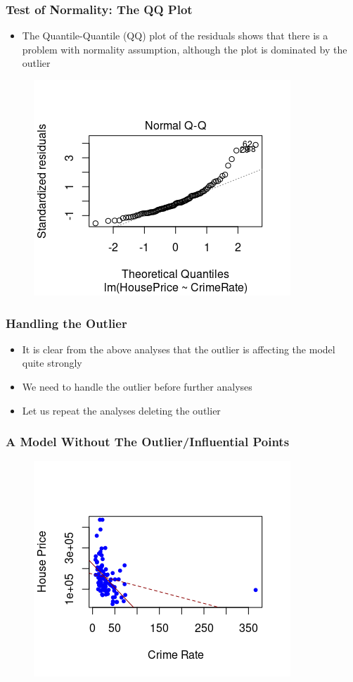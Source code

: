 \documentclass[compress]{beamer}
\begin{document}
\begin{frame}
\frametitle{\sc Test of Normality: The QQ Plot}
	\begin{itemize}
		\item The Quantile-Quantile (QQ) plot of the residuals shows that there is a problem with normality assumption, although the plot is dominated by the outlier
    \end{itemize}	
    \vspace{-.1in}
    \begin{figure}[!ht]
		\centering
		\includegraphics[scale=0.8]{figs8/QQ-full.png}
	\end{figure}	
\end{frame}

\begin{frame}
\frametitle{\sc Handling the Outlier}
	\begin{itemize}
		\item It is clear from the above analyses that the outlier is affecting the model quite  strongly
		\item We need to handle the outlier before further analyses
		\item Let us repeat the analyses deleting the outlier
    \end{itemize}	
\end{frame}

\begin{frame}
\frametitle{\sc A Model Without The Outlier/Influential Points}
    \begin{figure}[!ht]
		\centering
		\includegraphics[scale=0.9]{figs8/reg-minus-outlier.png}
	\end{figure}
\end{frame}
\end{document}
